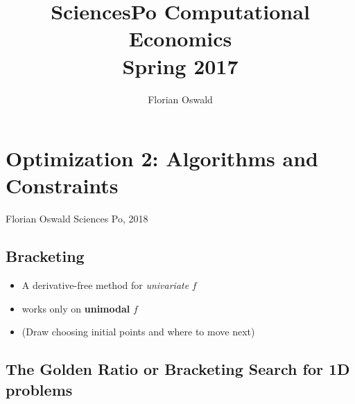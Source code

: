 \documentclass[11pt]{article}
\title{SciencesPo Computational Economics \\ Spring 2017}
\author{Florian Oswald}
\providecommand{\tightlist}{%
      \setlength{\itemsep}{0pt}\setlength{\parskip}{0pt}}
\begin{document}
    
    
    \maketitle
    
    

    
    \section{Optimization 2: Algorithms and
Constraints}\label{optimization-2-algorithms-and-constraints}

Florian Oswald Sciences Po, 2018

    \subsection{Bracketing}\label{bracketing}

\begin{itemize}
\tightlist
\item
  A derivative-free method for \emph{univariate} \(f\)
\item
  works only on \textbf{unimodal} \(f\)
\item
  (Draw choosing initial points and where to move next)
\end{itemize}

    \subsection{The Golden Ratio or Bracketing Search for 1D
problems}\label{the-golden-ratio-or-bracketing-search-for-1d-problems}
\end{document}
